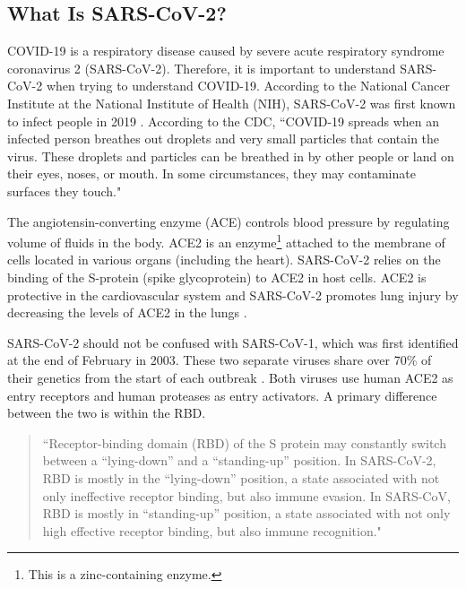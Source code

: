 \documentclass[10pt, a4paper, twocolumn]{book}
\begin{document}
\subsection{What Is SARS-CoV-2?}

COVID-19 is a respiratory disease caused by severe acute respiratory syndrome coronavirus 2 (SARS-CoV-2). Therefore, it is important to understand SARS-CoV-2 when trying to understand COVID-19. According to the National Cancer Institute at the National Institute of Health (NIH), SARS-CoV-2 was first known to infect people in 2019 \citep{NationalCancerInstituteSARS-CoV-2}. According to the CDC, ``COVID-19 spreads when an infected person breathes out droplets and very small particles that contain the virus. These droplets and particles can be breathed in by other people or land on their eyes, noses, or mouth. In some circumstances, they may contaminate surfaces they touch."

The angiotensin-converting enzyme (ACE) controls blood pressure by regulating volume of fluids in the body. ACE2 is an enzyme\footnote{This is a zinc-containing enzyme.} attached to the membrane of cells located in various organs (including the heart). SARS-CoV-2 relies on the binding of the S-protein (spike glycoprotein) to ACE2 in host cells. ACE2 is protective in the cardiovascular system and SARS-CoV-2 promotes lung injury by decreasing the levels of ACE2 in the lungs \citep{SpikeProteinDownregulation}.

SARS-CoV-2 should not be confused with SARS-CoV-1, which was first identified at the end of February in 2003. These two separate viruses share over 70\% of their genetics from the start of each outbreak \citep{SARSvsSARS}. Both viruses use human ACE2 as entry receptors and human proteases as entry activators. A primary difference between the two is within the RBD.

\begin{quotation}
	``Receptor-binding domain (RBD) of the S protein may constantly switch between a “lying-down” and a “standing-up” position. In SARS-CoV-2, RBD is mostly in the “lying-down” position, a state associated with not only ineffective receptor binding, but also immune evasion. In SARS-CoV, RBD is mostly in “standing-up” position, a state associated with not only high effective receptor binding, but also immune recognition." \citep{SARSvsSARS2}
\end{quotation}
\end{document}
